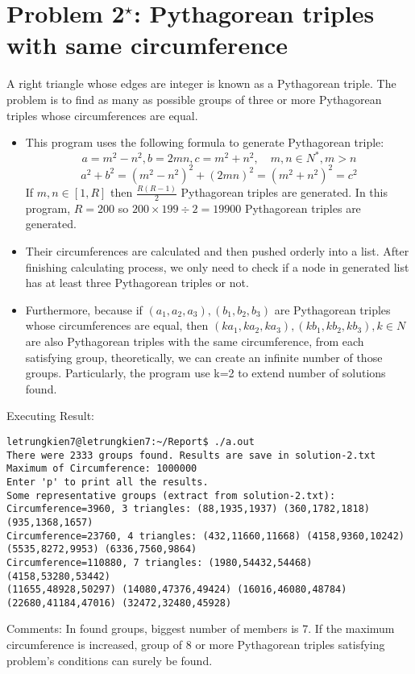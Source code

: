 \documentclass[11pt]{article}
\begin{document}
\section{Problem 2${}^{\star}$: \normalsize Pythagorean triples with same circumference}
\indent A right triangle whose edges are integer is known as a Pythagorean triple. The problem is to find as many as possible groups of three or more Pythagorean triples whose circumferences are equal. 
\begin{itemize}
\item This program uses the following formula to generate Pythagorean triple:
\[a=m^2-n^2, b=2mn, c=m^2+n^2,\quad  m,n \in N^{*}, m>n\]
\[a^2+b^2=(m^2-n^2)^2+(2mn)^2=(m^2+n^2)^2=c^2\]
If $m,n \in [1,R]$ then $\frac{R(R-1)}{2}$ Pythagorean triples are generated. In this program, $R=200$ so $200\times 199 \div 2 =19900 $ Pythagorean triples are generated. 
\item Their circumferences are calculated and then pushed orderly into a list. After finishing calculating process, we only need to check if a node in generated list has at least three Pythagorean triples or not.
\item Furthermore, because if $(a_1,a_2,a_3), (b_1, b_2, b_3)$ are Pythagorean triples whose circumferences are equal, then $(ka_1,ka_2,ka_3), (kb_1, kb_2, kb_3), k \in N$ are also Pythagorean triples with the same circumference, from each satisfying group, theoretically, we can create an infinite number of those groups. Particularly, the program use k=2 to extend number of solutions found.
\end{itemize}
Executing Result:
%
\begin{verbatim}
letrungkien7@letrungkien7:~/Report$ ./a.out 
There were 2333 groups found. Results are save in solution-2.txt
Maximum of Circumference: 1000000
Enter 'p' to print all the results.
Some representative groups (extract from solution-2.txt): 
Circumference=3960, 3 triangles: (88,1935,1937) (360,1782,1818) (935,1368,1657)
Circumference=23760, 4 triangles: (432,11660,11668) (4158,9360,10242) 
(5535,8272,9953) (6336,7560,9864)
Circumference=110880, 7 triangles: (1980,54432,54468) (4158,53280,53442) 
(11655,48928,50297) (14080,47376,49424) (16016,46080,48784)
(22680,41184,47016) (32472,32480,45928)
\end{verbatim}
Comments: In found groups, biggest number of members is 7. If the maximum circumference is increased, group of 8 or more Pythagorean triples satisfying problem's conditions can surely be found.
\newpage
\end{document}
